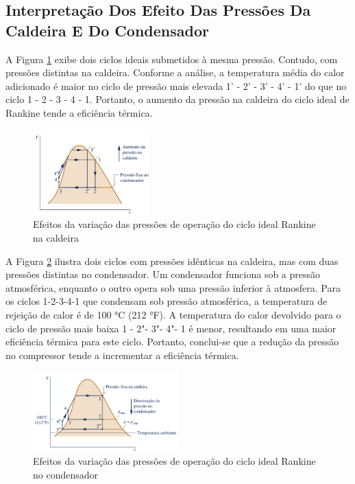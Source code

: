 \documentclass[
	article,			%
	11pt,				%
	oneside,			%
	a4paper,			%
	english,			%
	brazil,				%
	sumario=tradicional
	]{abntex2}
\begin{document}
\subsection{Interpretação Dos Efeito Das Pressões Da Caldeira E Do Condensador}

A Figura \ref{fig:efeitos-caldeira} exibe dois ciclos ideais submetidos à mesma pressão. Contudo, com pressões distintas na caldeira. Conforme a análise, a temperatura média do calor adicionado é maior no ciclo de pressão mais elevada 1' - 2' - 3' - 4' - 1' do que no ciclo 1 - 2 - 3 - 4 - 1. Portanto, o aumento da pressão na caldeira do ciclo ideal de Rankine tende a eficiência térmica.

\begin{figure}[h]
	\centering
	\includegraphics[width=0.4\textwidth]{./images/efeitos-caldeira.png}
	\caption{Efeitos da variação das pressões de operação do ciclo ideal Rankine na caldeira}
	\label{fig:efeitos-caldeira}
\end{figure}

A Figura \ref{fig:efeito-condensador} ilustra dois ciclos com pressões idênticas na caldeira, mas com duas pressões distintas no condensador. Um condensador funciona sob a pressão atmosférica, enquanto o outro opera sob uma pressão inferior à atmosfera. Para os ciclos 1-2-3-4-1 que condensam sob pressão atmosférica, a temperatura de rejeição de calor é de 100 °C (212 °F). A temperatura do calor devolvido para o ciclo de pressão mais baixa 1 - 2"- 3"- 4"- 1 é menor, resultando em uma maior eficiência térmica para este ciclo. Portanto, conclui-se que a redução da pressão no compressor tende a incrementar a eficiência térmica.

\begin{figure}[h]
	\centering
	\includegraphics[width=0.5\textwidth]{./images/efeito-condensador.png}
	\caption{Efeitos da variação das pressões de operação do ciclo ideal Rankine no condensador}
	\label{fig:efeito-condensador}
\end{figure}
\end{document}
